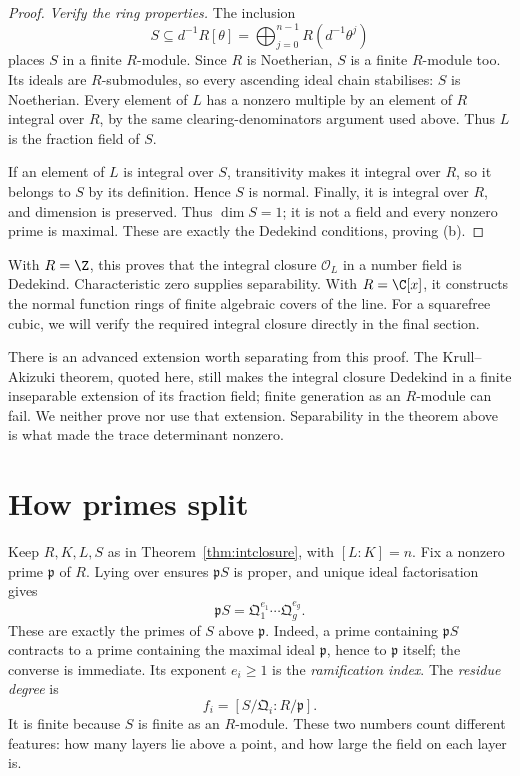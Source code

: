 \begin{proof}
\emph{Verify the ring properties.} The inclusion
\[
 S\subseteq d^{-1}R[\theta]
    =\bigoplus_{j=0}^{n-1}R(d^{-1}\theta^j)
\]
places $S$ in a finite $R$-module. Since $R$ is Noetherian, $S$ is a finite $R$-module too. Its ideals are $R$-submodules, so every ascending ideal chain stabilises: $S$ is Noetherian. Every element of $L$ has a nonzero multiple by an element of $R$ integral over $R$, by the same clearing-denominators argument used above. Thus $L$ is the fraction field of $S$.

If an element of $L$ is integral over $S$, transitivity makes it integral over $R$, so it belongs to $S$ by its definition. Hence $S$ is normal. Finally, it is integral over $R$, and dimension is preserved. Thus $\dim S=1$; it is not a field and every nonzero prime is maximal. These are exactly the Dedekind conditions, proving (b).
\end{proof}

With $R=\Z$, this proves that the integral closure $\mathcal O_L$ in a number field is Dedekind. Characteristic zero supplies separability. With $R=\C[x]$, it constructs the normal function rings of finite algebraic covers of the line. For a squarefree cubic, we will verify the required integral closure directly in the final section.

There is an advanced extension worth separating from this proof. The Krull--Akizuki theorem, quoted here, still makes the integral closure Dedekind in a finite inseparable extension of its fraction field; finite generation as an $R$-module can fail. We neither prove nor use that extension. Separability in the theorem above is what made the trace determinant nonzero.

\section{How primes split}

Keep $R,K,L,S$ as in Theorem~\ref{thm:intclosure}, with $[L:K]=n$. Fix a nonzero prime $\mathfrak p$ of $R$. Lying over ensures $\mathfrak pS$ is proper, and unique ideal factorisation gives
\[
 \mathfrak pS=\mathfrak Q_1^{e_1}\cdots\mathfrak Q_g^{e_g}.
\]
These are exactly the primes of $S$ above $\mathfrak p$. Indeed, a prime containing $\mathfrak pS$ contracts to a prime containing the maximal ideal $\mathfrak p$, hence to $\mathfrak p$ itself; the converse is immediate. Its exponent $e_i\ge1$ is the \emph{ramification index}. The \emph{residue degree} is
\[
 f_i=[S/\mathfrak Q_i:R/\mathfrak p].
\]
It is finite because $S$ is finite as an $R$-module. These two numbers count different features: how many layers lie above a point, and how large the field on each layer is.

